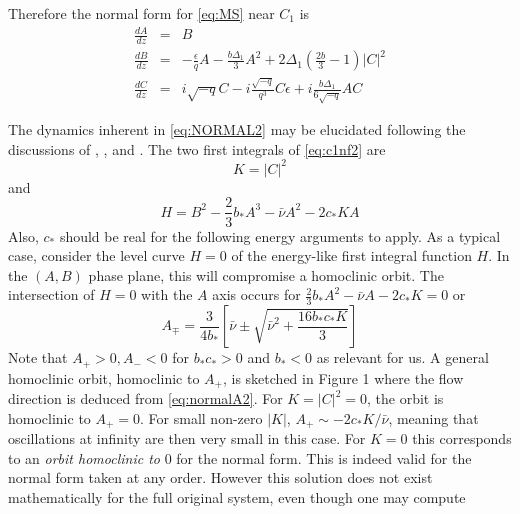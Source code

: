 
Therefore the normal form for \eqref{eq:MS} near $C_1$ is 
\begin{subequations}\label{eq:NORMAL2}
\begin{eqnarray} 
\frac{dA}{dz} &=& B  \label{eq:normalA2} \\
\frac{dB}{dz} &=& -\frac{\epsilon}{q} A - \frac{b \Delta_1 }{3} A^2 + 2 \Delta_1 \left(\frac{2 b }{3} - 1\right) \left|C\right|^2  \label{eq:normalB2} \\
\frac{dC}{dz} &=& i \sqrt{-q} C - i \frac{\sqrt{-q} }{q^3} C\epsilon + i \frac{b \Delta_1}{6 \sqrt{-q}} A C \label{eq:normalC2}
\end{eqnarray}
\end{subequations}

The dynamics inherent in \eqref{eq:NORMAL2} may be elucidated following the
discussions of \cite{IA}, \cite{IK}, \cite{Lombardi1} and \cite{Lombardi2}.
The two first integrals of \eqref{eq:c1nf2}  are
\begin{equation}
K = \left| C \right|^2
\end{equation}
and
\begin{equation}\label{eq:H2}
H = B^2 - \frac{2}{3} b_* A^3 - \bar{\nu} A^2 - 2 c_* K A
\end{equation}
Also, $c_*$ should be real  for the following energy arguments to apply.
As a typical case, consider  the level curve $H=0$ of the energy-like first
integral function $H$. In the $(A,B)$ phase plane, this will compromise a
homoclinic orbit. The intersection of $H=0$ with the $A$ axis occurs for $
\frac{2}{3} b_* A^2 - \bar{\nu}A - 2 c_* K = 0$ or
\begin{equation}
A_{\mp} = \frac{3}{4 b_*} \left[ \bar{\nu} \pm \sqrt{ \bar{\nu}^2 + \frac{16 b_* c_* K}{3} } \right]
\end{equation}
Note that $A_+ > 0, A_- < 0 $ for $b_* c_* > 0 $ and $b_* < 0$ as relevant for
us. A general homoclinic orbit, homoclinic to $A_+$, is sketched in Figure 1
where the flow direction is deduced from \eqref{eq:normalA2}.  For
$K=\left|C\right|^2 = 0 $, the orbit is homoclinic to $A_+=0$. For small
non-zero $\left|K\right|$, $ A_+ \sim - 2 c_* K / \bar{\nu}$, meaning that
oscillations at infinity are then very small in this case. For $K=0$ this
corresponds to an \emph{orbit homoclinic to} 0 for the normal form. This is indeed
valid for the normal form taken at any order. However this solution does not
exist mathematically for the full original system, even though one may compute
